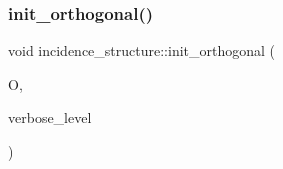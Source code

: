 \subsubsection{\texorpdfstring{init\+\_\+orthogonal()}{init\_orthogonal()}}
{\footnotesize\ttfamily void incidence\+\_\+structure\+::init\+\_\+orthogonal (\begin{DoxyParamCaption}\item[{\mbox{\hyperlink{classorthogonal}{orthogonal}} $\ast$}]{O,  }\item[{\mbox{\hyperlink{galois_8h_a09fddde158a3a20bd2dcadb609de11dc}{I\+NT}}}]{verbose\+\_\+level }\end{DoxyParamCaption})}

\mbox{\label{classincidence__structure_ac59c8f4edb758351e38b68bd0ecb979d}} 
